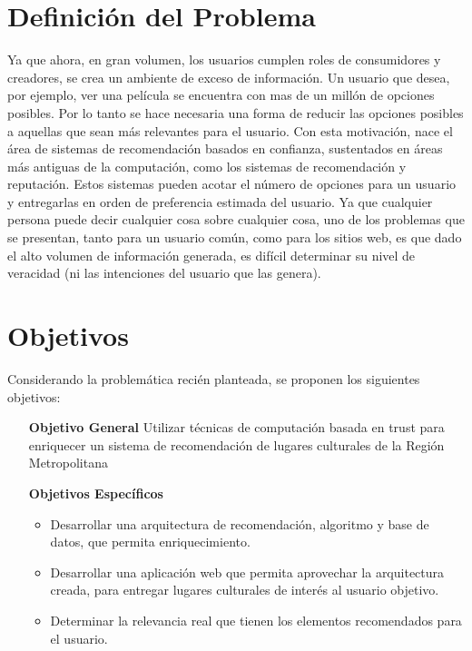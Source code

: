 \section{Definici\'on del Problema}


Ya que ahora, en gran volumen, los usuarios cumplen roles de consumidores y creadores, se crea un ambiente de exceso de información. Un usuario que desea, por ejemplo, ver una película se encuentra con mas de un millón de opciones posibles. Por lo tanto se hace necesaria una forma de reducir las opciones posibles a aquellas que sean más relevantes para el usuario.
Con esta motivación, nace el área de sistemas de recomendación basados en confianza, sustentados en áreas más antiguas de la computación, como los sistemas de recomendación y reputación. Estos sistemas pueden acotar el número de opciones para un usuario y entregarlas en orden de preferencia estimada del usuario.
Ya que cualquier persona puede decir cualquier cosa sobre cualquier cosa, uno de los problemas que se presentan, tanto para un usuario común, como para los sitios web, es que dado el alto volumen de información generada, es difícil determinar su nivel de veracidad (ni las intenciones del usuario que las genera).

\section{Objetivos}

Considerando la problemática recién planteada, se proponen los siguientes objetivos:

\begin{enumerate}

\item [\textbf{Objetivo General}] Utilizar técnicas de computación basada en trust para enriquecer un sistema de recomendación de lugares culturales de la Región Metropolitana
\item [\textbf{Objetivos Específicos}]
	\begin {itemize}
		\item Desarrollar una arquitectura de recomendación, algoritmo y base de datos, que permita enriquecimiento.
		\item Desarrollar una aplicación web que permita aprovechar la arquitectura creada, para entregar lugares culturales de interés al usuario objetivo.
		\item Determinar la relevancia real que tienen los elementos recomendados para el usuario.
	\end{itemize}

\end{enumerate}

